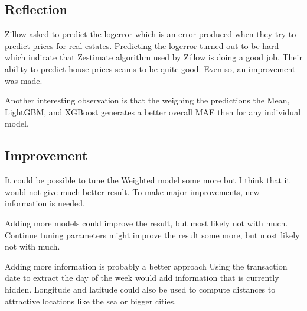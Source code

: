 \documentclass[a4paper]{article}
\begin{document}
\subsection{Reflection}
Zillow asked to predict the logerror which is an error produced when they try to predict prices for real estates. Predicting the logerror turned out to be hard which indicate that Zestimate algorithm used by Zillow is doing a good job. Their ability to predict house prices seams to be quite good. Even so, an improvement was made.

Another interesting observation is that the weighing the predictions the Mean, LightGBM, and XGBoost generates a better overall MAE then for any individual model.


\subsection{Improvement}
It could be possible to tune the Weighted model some more but I think that it would not give much better result. To make major improvements, new information is needed.

Adding more models could improve the result, but most likely not with much. Continue tuning parameters might improve the result some more, but most likely not with much.

Adding more information is probably a better approach Using the transaction date to extract the day of the week would add information that is currently hidden. Longitude and latitude could also be used to compute distances to attractive locations like the sea or bigger cities.
\end{document}
